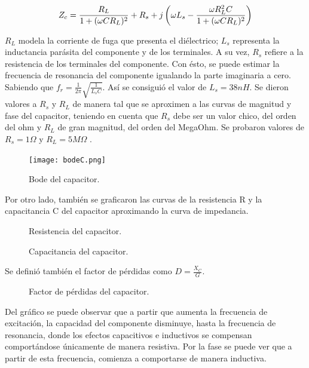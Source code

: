\begin{equation}
\centering
Z_c=\frac{R_L}{1+(\omega CR_L)^2}+R_s+j\left(\omega L_s-\frac{\omega R_L^2C}{1+(\omega CR_L)^2}\right)
\end{equation}

$R_L$ modela la corriente de fuga que presenta el diélectrico; $L_s$ representa la inductancia parásita del componente y de los terminales. A su vez, $R_s$ refiere a la resistencia de los terminales del componente.
Con ésto, se puede estimar la frecuencia de resonancia del componente igualando la parte imaginaria a cero. Sabiendo que $f_r=\frac{1}{2\pi}\sqrt{\frac{1}{L_sC}}$. Así se consiguió el valor de $L_s=38nH$. 
Se dieron valores a $R_s$ y $R_L$ de manera tal que se aproximen a las curvas de magnitud y fase del capacitor, teniendo en cuenta que $R_s$ debe ser un valor chico, del orden del ohm y $R_L$ de gran magnitud, del orden del MegaOhm. Se probaron valores de $R_s=1\Omega$ y $R_L=5M\Omega$ .

\begin{figure}[h!]
\centering
\texttt{[image: bodeC.png]}
\caption{Bode del capacitor.}
\label{fig:bodeC}
\end{figure}

Por otro lado, también se graficaron las curvas de la resistencia R y la capacitancia C del capacitor aproximando la curva de impedancia.

\begin{figure}[h!]
\centering
\caption{Resistencia del capacitor.}
\label{fig:RdelC}
\end{figure}

\begin{figure}[h!]
\centering
\caption{Capacitancia del capacitor.}
\label{fig:CdelC}
\end{figure}

Se definió también el factor de pérdidas  como $D=\frac{X_C}{G}$.

\begin{figure}[h!]
\centering
\caption{Factor de pérdidas del capacitor.}
\label{fig:DdelC}
\end{figure}

Del gráfico se puede observar que a partir que aumenta la frecuencia de excitación, la capacidad del componente disminuye, hasta la frecuencia de resonancia, donde los efectos capacitivos  e inductivos se compensan comportándose únicamente de manera resistiva. Por la fase se puede ver que a partir de esta frecuencia, comienza a comportarse de manera inductiva.

